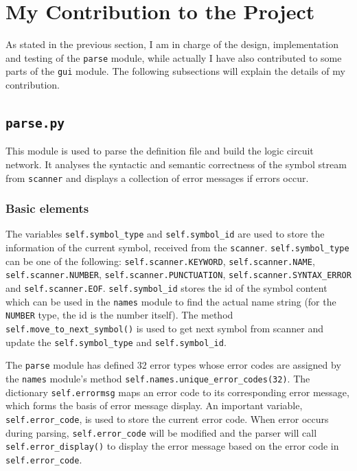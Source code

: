 \documentclass[10pt,a4paper]{article}
\begin{document}
\section{My Contribution to the Project}
\label{sec:orgcddbec0}

As stated in the previous section, I am in charge of the design,
implementation and testing of the \texttt{parse} module, while actually I
have also contributed to some parts of the \texttt{gui} module. The following
subsections will explain the details of my contribution.

\subsection{\texttt{parse.py}}
\label{sec:org2aabf25}

This module is used to parse the definition file and build the logic
circuit network. It analyses the syntactic and semantic correctness of
the symbol stream from \texttt{scanner} and displays a collection of error
messages if errors occur.

\subsubsection{Basic elements}
\label{sec:org082a594}

The variables \texttt{self.symbol\_type} and \texttt{self.symbol\_id} are used to
store the information of the current symbol, received from the
\texttt{scanner}. \texttt{self.symbol\_type} can be one of the following:
\texttt{self.scanner.KEYWORD}, \texttt{self.scanner.NAME}, \texttt{self.scanner.NUMBER},
\texttt{self.scanner.PUNCTUATION}, \texttt{self.scanner.SYNTAX\_ERROR} and
\texttt{self.scanner.EOF}. \texttt{self.symbol\_id} stores the id of the symbol
content which can be used in the \texttt{names} module to find the actual
name string (for the \texttt{NUMBER} type, the id is the number itself). The
method \texttt{self.move\_to\_next\_symbol()} is used to get next symbol from
scanner and update the \texttt{self.symbol\_type} and \texttt{self.symbol\_id}.

The \texttt{parse} module has defined 32 error types whose error codes are
assigned by the \texttt{names} module's method
\texttt{self.names.unique\_error\_codes(32)}. The dictionary \texttt{self.errormsg}
maps an error code to its corresponding error message, which forms the
basis of error message display. An important variable,
\texttt{self.error\_code}, is used to store the current error code. When error
occurs during parsing, \texttt{self.error\_code} will be modified and the
parser will call \texttt{self.error\_display()} to display the error message
based on the error code in \texttt{self.error\_code}.
\end{document}
